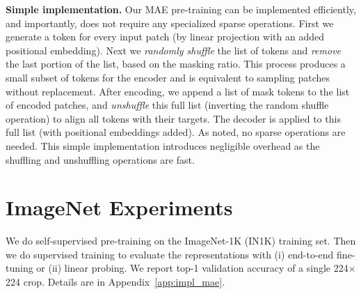 \documentclass[10pt,twocolumn,letterpaper]{article}
\renewcommand{\paragraph}[1]{\vspace{1.25mm}\noindent\textbf{#1}}
\begin{document}
\paragraph{Simple implementation.} Our MAE pre-training can be implemented efficiently, and importantly, does not require any specialized sparse operations. First we generate a token for every input patch (by linear projection with an added positional embedding). Next we \emph{randomly shuffle} the list of tokens and \emph{remove} the last portion of the list, based on the masking ratio. This process produces a small subset of tokens for the encoder and is equivalent to sampling patches without replacement. After encoding, we append a list of mask tokens to the list of encoded patches, and \emph{unshuffle} this full list (inverting the random shuffle operation) to align all tokens with their targets. The decoder is applied to this full list (with positional embeddings added). As noted, no sparse operations are needed. This simple implementation introduces negligible overhead as the shuffling and unshuffling operations are fast.

\section{ImageNet Experiments}
\label{sec:exp}

We do self-supervised pre-training on the ImageNet-1K (IN1K) \cite{Deng2009} training set. Then we do supervised training to evaluate the representations with (i) end-to-end fine-tuning or (ii) linear probing. We report top-1 validation accuracy of a single 224$\times$224 crop. Details are in Appendix~\ref{app:impl_mae}.
\end{document}
